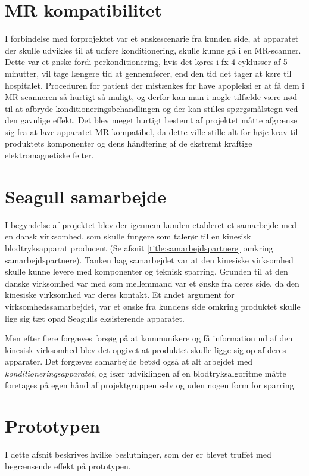 \section{MR kompatibilitet}
I forbindelse med forprojektet var et ønskescenarie fra kunden side, at apparatet der skulle udvikles til at udføre konditionering, skulle kunne gå i en MR-scanner. Dette var et ønske fordi perkonditionering, hvis det køres i fx 4 cyklusser af 5 minutter, vil tage længere tid at gennemfører, end den tid det tager at køre til hospitalet. Proceduren for patient der mistænkes for have apopleksi er at få dem i MR scanneren så hurtigt så muligt, og derfor kan man i nogle tilfælde være nød til at afbryde konditioneringsbehandlingen og der kan stilles spørgsmålstegn ved den gavnlige effekt. Det blev meget hurtigt bestemt af projektet måtte afgrænse sig fra at lave apparatet MR kompatibel, da dette ville stille alt for høje krav til produktets komponenter og dens håndtering af de ekstremt kraftige elektromagnetiske felter.

\section{Seagull samarbejde}
I begyndelse af projektet blev der igennem kunden etableret et samarbejde med en dansk virksomhed, som skulle fungere som talerør til en kinesisk blodtryksapparat producent (Se afsnit \ref{title:samarbejdspartnere} omkring samarbejdspartnere). Tanken bag samarbejdet var at den kinesiske virksomhed skulle kunne levere med komponenter og teknisk sparring. Grunden til at den danske virksomhed var med som mellemmand var et ønske fra deres side, da den kinesiske virksomhed var deres kontakt. Et andet argument for virksomhedssamarbejdet, var et ønske fra kundens side omkring produktet skulle lige sig tæt opad Seagulls eksisterende apparatet. 

Men efter flere forgæves forsøg på at kommunikere og få information ud af den kinesisk virksomhed blev det opgivet at produktet skulle ligge sig op af deres apparater. Det forgæves samarbejde betød også at alt arbejdet med \textit{konditioneringsapparatet}, og især udviklingen af en blodtryksalgoritme måtte foretages på egen hånd af projektgruppen selv og uden nogen form for sparring. 

\section{Prototypen}
I dette afsnit beskrives hvilke beslutninger, som der er blevet truffet med begrænsende effekt på prototypen.

